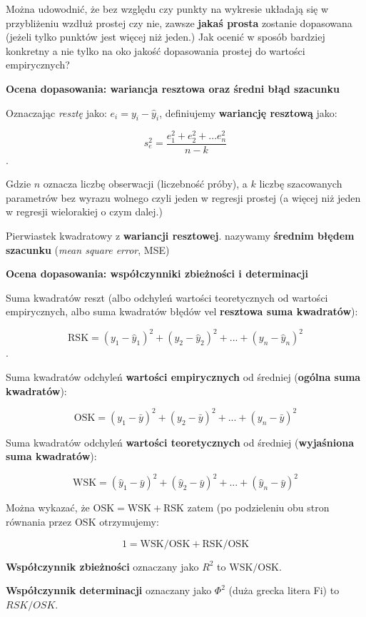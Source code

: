 \documentclass[
  openany]{book}
\begin{document}
Można udowodnić, że bez względu czy punkty na wykresie układają się
w przybliżeniu wzdłuż prostej czy nie, zawsze \textbf{jakaś prosta} zostanie
dopasowana (jeżeli tylko punktów jest więcej niż jeden.)
Jak ocenić w sposób bardziej konkretny a nie tylko na oko jakość dopasowania
prostej do wartości empirycznych?

\textbf{Ocena dopasowania: wariancja resztowa oraz średni błąd szacunku}

Oznaczając \emph{resztę} jako: \(e_i = y_i - \hat y_i\), definiujemy \textbf{wariancję
resztową} jako:

\[s_e^2 = \frac{e_1^2 + e_2^2 + ... e_n^2}{n-k}\].

Gdzie \(n\) oznacza liczbę obserwacji (liczebność próby), a \(k\) liczbę
szacowanych parametrów bez wyrazu wolnego czyli jeden w regresji
prostej (a więcej niż jeden w regresji wielorakiej o czym dalej.)

Pierwiastek kwadratowy z \textbf{wariancji resztowej}.
nazywamy \textbf{średnim błędem szacunku} (\emph{mean square error}, MSE)

\textbf{Ocena dopasowania: współczynniki zbieżności i determinacji}

Suma kwadratów reszt (albo odchyleń wartości teoretycznych
od wartości empirycznych,
albo suma kwadratów błędów vel \textbf{resztowa suma kwadratów}):

\[\mathrm{RSK} = (y_1 - \hat y_1)^2 + (y_2 - \hat y_2)^2 + ... +  (y_n - \hat y_n)^2\].

Suma kwadratów odchyleń \textbf{wartości empirycznych}
od średniej (\textbf{ogólna suma kwadratów}):

\[\mathrm{OSK} = (y_1 - \bar y)^2 + (y_2 - \bar y)^2 + ... +  (y_n - \bar y)^2\]

Suma kwadratów odchyleń \textbf{wartości teoretycznych}
od średniej (\textbf{wyjaśniona suma kwadratów}):

\[\mathrm{WSK} = (\hat y_1 - \bar y)^2 + (\hat y_2 - \bar y)^2 + ... +  (\hat y_n - \bar y)^2\]

Można wykazać, że \(\mathrm{OSK} = \mathrm{WSK} + \mathrm{RSK}\) zatem (po podzieleniu obu stron
równania przez \(\mathrm{OSK}\) otrzymujemy:

\[ 1 =  \mathrm{WSK}/\mathrm{OSK} + \mathrm{RSK}/\mathrm{OSK}\]

\textbf{Współczynnik zbieżności} oznaczany jako \(R^2\) to \(\mathrm{WSK}/\mathrm{OSK}\).

\textbf{Współczynnik determinacji} oznaczany jako \(\Phi^2\) (duża grecka litera Fi) to \(RSK/OSK\).
\end{document}
